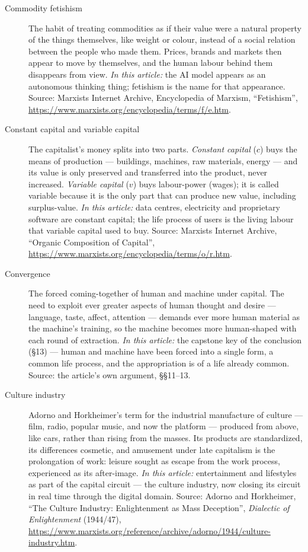 \documentclass[11pt]{article}
\begin{document}
\begin{description}
\item[Commodity fetishism] The habit of treating commodities as if their
value were a natural property of the things themselves, like weight or
colour, instead of a social relation between the people who made them.
Prices, brands and markets then appear to move by themselves, and the
human labour behind them disappears from view. \emph{In this article:}
the AI model appears as an autonomous thinking thing; fetishism is the
name for that appearance. Source: Marxists Internet Archive,
Encyclopedia of Marxism, ``Fetishism'',
\url{https://www.marxists.org/encyclopedia/terms/f/e.htm}.

\item[Constant capital and variable capital] The capitalist's money
splits into two parts. \emph{Constant capital} ($c$) buys the means of
production --- buildings, machines, raw materials, energy --- and its
value is only preserved and transferred into the product, never
increased. \emph{Variable capital} ($v$) buys labour-power (wages); it
is called variable because it is the only part that can produce new
value, including surplus-value. \emph{In this article:} data centres,
electricity and proprietary software are constant capital; the life
process of users is the living labour that variable capital used to
buy. Source: Marxists Internet Archive, ``Organic Composition of
Capital'',
\url{https://www.marxists.org/encyclopedia/terms/o/r.htm}.

\item[Convergence] The forced coming-together of human and machine
under capital. The need to exploit ever greater aspects of human
thought and desire --- language, taste, affect, attention --- demands
ever more human material as the machine's training, so the machine
becomes more human-shaped with each round of extraction. \emph{In this
article:} the capstone key of the conclusion (§13) --- human and machine
have been forced into a single form, a common life process, and the
appropriation is of a life already common. Source: the article's own
argument, §§11--13.

\item[Culture industry] Adorno and Horkheimer's term for the industrial
manufacture of culture --- film, radio, popular music, and now the
platform --- produced from above, like cars, rather than rising from the
masses. Its products are standardized, its differences cosmetic, and
amusement under late capitalism is the prolongation of work: leisure
sought as escape from the work process, experienced as its after-image.
\emph{In this article:} entertainment and lifestyles as part of the
capital circuit --- the culture industry, now closing its circuit in
real time through the digital domain. Source: Adorno and Horkheimer,
``The Culture Industry: Enlightenment as Mass Deception'',
\textit{Dialectic of Enlightenment} (1944/47),
\url{https://www.marxists.org/reference/archive/adorno/1944/culture-industry.htm}.


\end{description}
\end{document}
